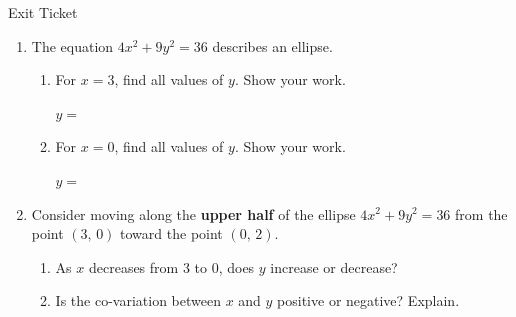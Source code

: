 \documentclass[10pt]{article}
\begin{document}
\namedateperiod

\vspace{0.12in}

\begin{notesbox}{Exit Ticket}
\begin{enumerate}[leftmargin=1.5em, itemsep=8pt]

\item The equation $4x^2 + 9y^2 = 36$ describes an ellipse.

\begin{enumerate}[leftmargin=1.2em, itemsep=6pt]
    \item[(a)] For $x = 3$, find all values of $y$. Show your work.

    \vspace{0.6in}
    $y = $ \blank{4cm}

    \item[(b)] For $x = 0$, find all values of $y$. Show your work.

    \vspace{0.5in}
    $y = $ \blank{4cm}
\end{enumerate}

\item Consider moving along the \textbf{upper half} of the ellipse $4x^2 + 9y^2 = 36$
from the point $(3,\, 0)$ toward the point $(0,\, 2)$.

\begin{enumerate}[leftmargin=1.2em, itemsep=6pt]
    \item[(a)] As $x$ decreases from 3 to 0, does $y$ increase or decrease?

    \vspace{0.2in}
    \blank{5cm}

    \item[(b)] Is the co-variation between $x$ and $y$ positive or negative? Explain.

    \vspace{0.4in}
    \blank{10cm}
\end{enumerate}

\end{enumerate}
\end{notesbox}
\end{document}

